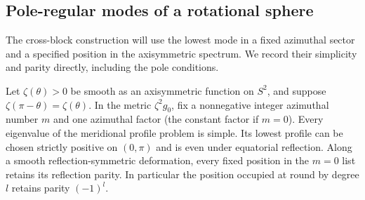 \subsection{Pole-regular modes of a rotational sphere}

The cross-block construction will use the lowest mode in a fixed azimuthal
sector and a specified position in the axisymmetric spectrum. We record
their simplicity and parity directly, including the pole conditions.

\begin{lemma}
\label{n:lem-pole-modes}
Let $\zeta(\theta)>0$ be smooth as an axisymmetric function on $S^2$,
and suppose $\zeta(\pi-\theta)=\zeta(\theta)$. In the metric
$\zeta^2g_0$, fix a nonnegative integer azimuthal number $m$ and one
azimuthal factor (the constant factor if $m=0$). Every eigenvalue of the
meridional profile problem is simple. Its lowest profile can be chosen
strictly positive on $(0,\pi)$ and is even under equatorial reflection.
Along a smooth reflection-symmetric deformation, every fixed position
in the $m=0$ list retains its reflection parity. In particular the
position occupied at round by degree $l$ retains parity $(-1)^l$.
\end{lemma}

